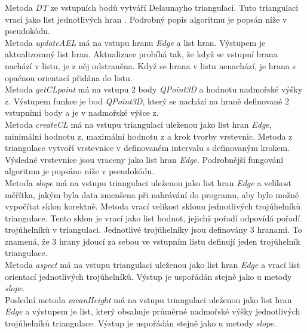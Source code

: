 \documentclass{article}
\begin{document}
Metoda \emph{DT} ze vstupních bodů vytváří Delaunayho triangulaci. Tuto triangulaci vrací jako list jednotlivých hran . Podrobný popis algoritmu je popsán níže v pseudokódu.\\
Metoda \emph{updateAEL} má na vstupu hranu \emph{Edge} a list hran. Výstupem je aktualizovaný list hran. Aktualizace probíhá tak, že když se vstupní hrana nachází v listu, je z něj odstraněna. Když se hrana v listu nenachází, je hrana s opačnou orientací přidána do listu.\\
Metoda \emph{getCLpoint} má na vstupu 2 body \emph{QPoint3D} a hodnotu nadmořské výšky z. Výstupem funkce je bod \emph{QPoint3D}, který se nachází na hraně definované 2 vstupními body a je v nadmořské výšce z.\\
Metoda \emph{createCL} má na vstupu triangulaci uleženou jako list hran \emph{Edge}, minimální hodnotu z, maximální hodnotu z a krok tvorby vrstevnic. Metoda z triangulace vytvoří vrstevnice v definovaném intervalu s definovaným krokem. Výsledné vrstevnice jsou vraceny jako list hran \emph{Edge}. Podrobnější fungování algoritmu je popsáno níže v pseudokódu.\\
Metoda \emph{slope} má na vstupu triangulaci uleženou jako list hran \emph{Edge} a velikost měřítka, jakým byla data zmenšena při nahrávání do programu, aby bylo možné vypočítat sklon korektně. Metoda vrací velikost sklonu jednotlivých trojúhelníků triangulace. Tento sklon je vrací jako list hodnot, jejichž pořadí odpovídá pořadí trojúhelníků v triangulaci. Jednotlivé trojúhelníky jsou definovány 3 hranami. To znamená, že 3 hrany jdoucí za sebou ve vstupním listu definují jeden trojúhelník triangulace.\\
Metoda \emph{aspect} má na vstupu triangulaci uleženou jako list hran \emph{Edge} a vrací list orientací jednotlivých trojúhelníků. Výstup je uspořádán stejně jako u metody \emph{slope}.\\
Poslední metoda \emph{meanHeight} má na vstupu triangulaci uleženou jako list hran \emph{Edge} a výstupem je list, který obsahuje průměrné nadmořské výšky jednotlivých trojúhelníků triangulace. Výstup je uspořádán stejně jako u metody \emph{slope}.
\end{document}

